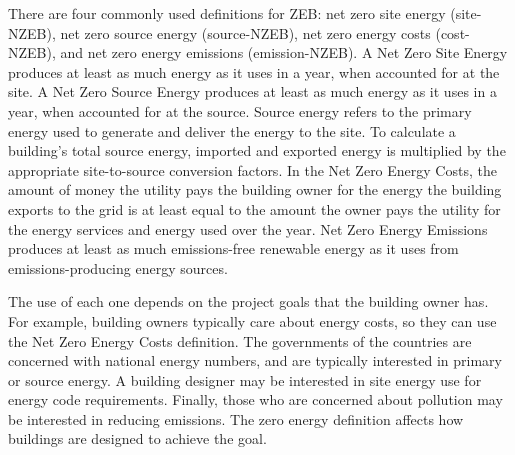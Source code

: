 There are four commonly used definitions for ZEB: net zero site energy (site-NZEB), net zero source energy (source-NZEB), net zero energy costs (cost-NZEB), and net zero energy emissions (emission-NZEB). A Net Zero Site Energy produces at least as much energy as it uses in a year, when accounted for at the site. A Net Zero Source Energy produces at least as much energy as it uses in a year, when accounted for at the source. Source energy refers to the primary energy used to generate and deliver the energy to the site. To calculate a building's total source energy, imported and exported energy is multiplied by the appropriate site-to-source conversion factors. In the Net Zero Energy Costs, the amount of money the utility pays the building owner for the energy the building exports to the grid is at least equal to the amount the owner pays the utility for the energy services and energy used over the year. Net Zero Energy Emissions produces at least as much emissions-free renewable energy as it uses from emissions-producing energy sources. 

The use of each one depends on the project goals that the building owner has. For example, building owners typically care about energy costs, so they can use the Net Zero Energy Costs definition. The governments of the countries are concerned with national energy numbers, and are typically interested in primary or source energy. A building designer may be interested in site energy use for energy code requirements. Finally, those who are concerned about pollution may be interested in reducing emissions. The zero energy definition affects how buildings are designed to achieve the goal.
\newpage
